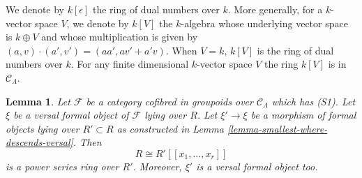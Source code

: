 \documentclass{amsart}
\theoremstyle{plain}
\newtheorem{lemma}[subsection]{Lemma}
\theoremstyle{definition}
\theoremstyle{remark}
\numberwithin{equation}{subsection}
\begin{document}
\medskip\noindent
We denote by $k[\epsilon]$ the ring of dual numbers over $k$.  More
generally, for a $k$-vector space $V$, we denote by $k[V]$ the $k$-algebra
whose underlying vector space is $k \oplus V$ and whose multiplication is given
by $(a, v) \cdot (a', v') = (aa', av' + a'v)$.  When $V = k$, $k[V]$ is the ring
of dual numbers over $k$.  For any finite dimensional $k$-vector space $V$
the ring $k[V]$ is in $\mathcal{C}_\Lambda$.


\begin{lemma}
\label{lemma-descends-versal}
Let $\mathcal{F}$ be a category cofibred in groupoids over
$\mathcal{C}_\Lambda$ which has (S1). Let $\xi$ be a versal formal object
of $\mathcal{F}$ lying over $R$. Let $\xi' \to \xi$ be a morphism
of formal objects lying over $R' \subset R$ as constructed in
Lemma \ref{lemma-smallest-where-descends-versal}.
Then
$$
R \cong R'[[x_1, \ldots, x_r]]
$$
is a power series ring over $R'$.
Moreover, $\xi'$ is a versal formal object too.
\end{lemma}
\end{document}

